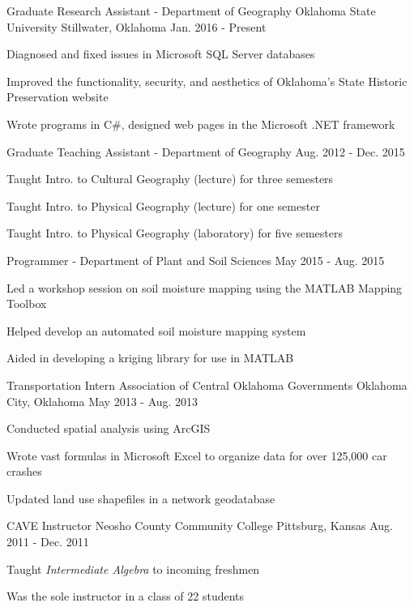 \begin{cventries}
  \cventry
    {Graduate Research Assistant - Department of Geography}
    {Oklahoma State University}
    {Stillwater, Oklahoma}
    {Jan. 2016 - Present}
    {
      \begin{cvitems}
        \item {Diagnosed and fixed issues in Microsoft SQL Server databases}
        \item {Improved the functionality, security, and aesthetics of Oklahoma's State Historic Preservation website}
        \item {Wrote programs in C\#, designed web pages in the Microsoft .NET framework}
      \end{cvitems}
    }
  \cventry
    {Graduate Teaching Assistant - Department of Geography}
    {}
    {}
    {Aug. 2012 - Dec. 2015}
    {
      \begin{cvitems}
        \item {Taught Intro. to Cultural Geography (lecture) for three semesters}
        \item {Taught Intro. to Physical Geography (lecture) for one semester}
        \item {Taught Intro. to Physical Geography (laboratory) for five semesters}
      \end{cvitems}
    }
  \cventry
    {Programmer - Department of Plant and Soil Sciences}
    {}
    {}
    {May 2015 - Aug. 2015}
    {
      \begin{cvitems}
        \item {Led a workshop session on soil moisture mapping using the MATLAB Mapping Toolbox}
        \item {Helped develop an automated soil moisture mapping system}
        \item {Aided in developing a kriging library for use in MATLAB}
      \end{cvitems}
    }
  \cventry
    {Transportation Intern}
    {Association of Central Oklahoma Governments}
    {Oklahoma City, Oklahoma}
    {May 2013 - Aug. 2013}
    {
      \begin{cvitems}
        \item {Conducted spatial analysis using ArcGIS}
        \item {Wrote vast formulas in Microsoft Excel to organize data for over 125,000 car crashes}
        \item {Updated land use shapefiles in a network geodatabase}
      \end{cvitems}
    }
  \cventry
    {CAVE Instructor}
    {Neosho County Community College}
    {Pittsburg, Kansas}
    {Aug. 2011 - Dec. 2011}
    {
      \begin{cvitems}
        \item {Taught \textit{Intermediate Algebra} to incoming freshmen}
        \item {Was the sole instructor in a class of 22 students}
      \end{cvitems}
    }
    

\end{cventries}
